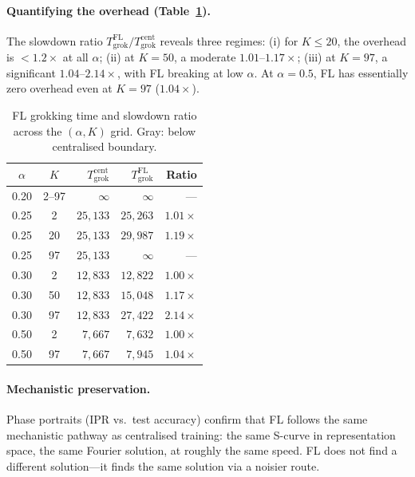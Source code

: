 \documentclass{article}
\begin{document}
\paragraph{Quantifying the overhead (Table~\ref{tab:exp2}).}
The slowdown ratio $T_{\mathrm{grok}}^{\mathrm{FL}} / T_{\mathrm{grok}}^{\mathrm{cent}}$ reveals three regimes: (i) for $K \leq 20$, the overhead is $< 1.2\times$ at all $\alpha$; (ii) at $K = 50$, a moderate $1.01$--$1.17\times$; (iii) at $K = 97$, a significant $1.04$--$2.14\times$, with FL breaking at low $\alpha$.
At $\alpha = 0.5$, FL has essentially zero overhead even at $K = 97$ ($1.04\times$).

\begin{table}[t]
\centering
\small
\caption{FL grokking time and slowdown ratio across the $(\alpha, K)$ grid. Gray: below centralised boundary.}
\label{tab:exp2}
\begin{tabular}{ccrrr}
\toprule
$\alpha$ & $K$ & $T_{\mathrm{grok}}^{\mathrm{cent}}$ & $T_{\mathrm{grok}}^{\mathrm{FL}}$ & Ratio \\
\midrule
\rowcolor{gray!15} 0.20 & 2--97 & $\infty$ & $\infty$ & --- \\
\midrule
0.25 &  2 & $25{,}133$ & $25{,}263$ & $1.01\times$ \\
0.25 & 20 & $25{,}133$ & $29{,}987$ & $1.19\times$ \\
\rowcolor{nogrokred!10} 0.25 & 97 & $25{,}133$ & $\infty$ & --- \\
\midrule
0.30 &  2 & $12{,}833$ & $12{,}822$ & $1.00\times$ \\
0.30 & 50 & $12{,}833$ & $15{,}048$ & $1.17\times$ \\
0.30 & 97 & $12{,}833$ & $27{,}422$ & $2.14\times$ \\
\midrule
0.50 &  2 & $7{,}667$ & $7{,}632$ & $1.00\times$ \\
0.50 & 97 & $7{,}667$ & $7{,}945$ & $1.04\times$ \\
\bottomrule
\end{tabular}
\end{table}

\paragraph{Mechanistic preservation.}
Phase portraits (IPR vs.\ test accuracy) confirm that FL follows the same mechanistic pathway as centralised training: the same S-curve in representation space, the same Fourier solution, at roughly the same speed.
FL does not find a different solution---it finds the same solution via a noisier route.
\end{document}
